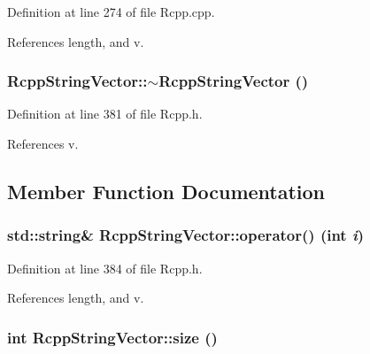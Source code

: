 Definition at line 274 of file Rcpp.cpp.

References length, and v.\hypertarget{classRcppStringVector_1b0550e206ac6945b00ee02c3c4bf373}{
\subsubsection[$\sim$RcppStringVector]{\setlength{\rightskip}{0pt plus 5cm}RcppStringVector::$\sim$RcppStringVector ()}}
\label{classRcppStringVector_1b0550e206ac6945b00ee02c3c4bf373}




Definition at line 381 of file Rcpp.h.

References v.

\subsection{Member Function Documentation}
\hypertarget{classRcppStringVector_ea5aa96f98f1c5b21e3c56ff60c7c413}{
\subsubsection[operator()]{\setlength{\rightskip}{0pt plus 5cm}std::string\& RcppStringVector::operator() (int {\em i})}}
\label{classRcppStringVector_ea5aa96f98f1c5b21e3c56ff60c7c413}




Definition at line 384 of file Rcpp.h.

References length, and v.\hypertarget{classRcppStringVector_c52a8eb61411546a62a70636709b1172}{
\subsubsection[size]{\setlength{\rightskip}{0pt plus 5cm}int RcppStringVector::size ()}}
\label{classRcppStringVector_c52a8eb61411546a62a70636709b1172}





